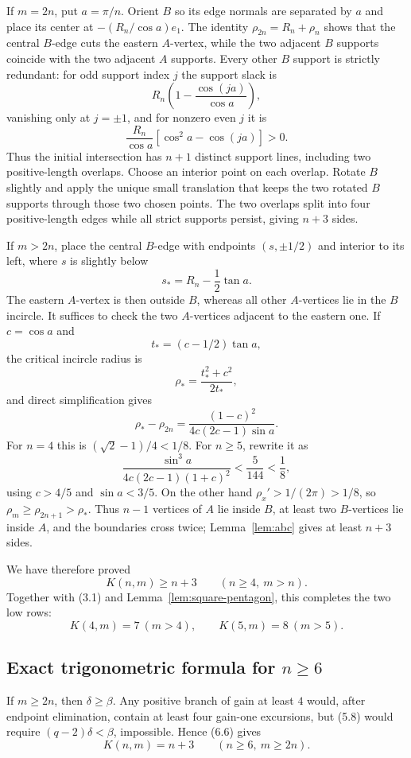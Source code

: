 \documentclass[11pt]{article}
\theoremstyle{remark}
\begin{document}
If $m=2n$, put $a=\pi/n$. Orient $B$ so its edge normals are separated by $a$ and place its center at $-(R_n/\cos a)e_1$. The identity $\rho_{2n}=R_n+\rho_n$ shows that the central $B$-edge cuts the eastern $A$-vertex, while the two adjacent $B$ supports coincide with the two adjacent $A$ supports. Every other $B$ support is strictly redundant: for odd support index $j$ the support slack is
\[
R_n\left(1-\frac{\cos(ja)}{\cos a}\right),
\]
vanishing only at $j=\pm1$, and for nonzero even $j$ it is
\[
\frac{R_n}{\cos a}[\cos^2a-\cos(ja)]>0.
\]
Thus the initial intersection has $n+1$ distinct support lines, including two positive-length overlaps. Choose an interior point on each overlap. Rotate $B$ slightly and apply the unique small translation that keeps the two rotated $B$ supports through those two chosen points. The two overlaps split into four positive-length edges while all strict supports persist, giving $n+3$ sides.

If $m>2n$, place the central $B$-edge with endpoints $(s,\pm1/2)$ and interior to its left, where $s$ is slightly below
\[
s_*=R_n-\frac12\tan a.
\]
The eastern $A$-vertex is then outside $B$, whereas all other $A$-vertices lie in the $B$ incircle. It suffices to check the two $A$-vertices adjacent to the eastern one. If $c=\cos a$ and
\[
t_*=(c-1/2)\tan a,
\]
the critical incircle radius is
\[
\rho_* =\frac{t_*^2+c^2}{2t_*},
\]
and direct simplification gives
\[
\rho_* -\rho_{2n}
=\frac{(1-c)^2}{4c(2c-1)\sin a}.
\]
For $n=4$ this is $(\sqrt2-1)/4<1/8$. For $n\ge5$, rewrite it as
\[
\frac{\sin^3a}{4c(2c-1)(1+c)^2}
<\frac5{144}<\frac18,
\]
using $c>4/5$ and $\sin a<3/5$. On the other hand $\rho_x'>1/(2\pi)>1/8$, so $\rho_m\ge\rho_{2n+1}>\rho_*$. Thus $n-1$ vertices of $A$ lie inside $B$, at least two $B$-vertices lie inside $A$, and the boundaries cross twice; Lemma~\ref{lem:abc} gives at least $n+3$ sides.

We have therefore proved
\[
\boxed{K(n,m)\ge n+3\qquad(n\ge4,\ m>n).}
\tag{6.6}
\]
Together with (3.1) and Lemma~\ref{lem:square-pentagon}, this completes the two low rows:
\[
\boxed{K(4,m)=7\ (m>4),\qquad K(5,m)=8\ (m>5).}
\tag{6.7}
\]

\subsection{Exact trigonometric formula for \texorpdfstring{$n\ge6$}{n >= 6}}

If $m\ge2n$, then $\delta\ge\beta$. Any positive branch of gain at least $4$ would, after endpoint elimination, contain at least four gain-one excursions, but (5.8) would require $(q-2)\delta<\beta$, impossible. Hence (6.6) gives
\[
K(n,m)=n+3\qquad(n\ge6,\ m\ge2n).
\tag{6.8}
\]
\end{document}
